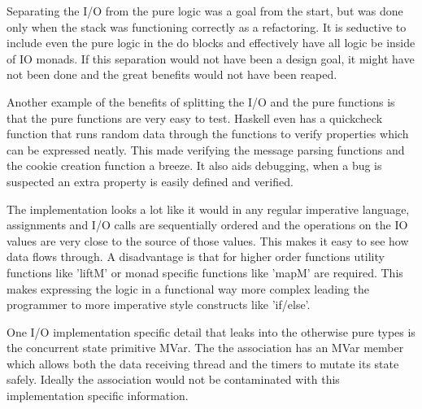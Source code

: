 Separating the I/O from the pure logic was a goal from the start, but was done only when the stack was functioning correctly as a refactoring. It is seductive to include even the pure logic in the do blocks and effectively have all logic be inside of IO monads. If this separation would not have been a design goal, it might have not been done and the great benefits would not have been reaped.

Another example of the benefits of splitting the I/O and the pure functions is that the pure functions are very easy to test. Haskell even has a quickcheck function that runs random data through the functions to verify properties which can be expressed neatly. This made verifying the message parsing functions and the cookie creation function a breeze. It also aids debugging, when a bug is suspected an extra property is easily defined and verified.

The implementation looks a lot like it would in any regular imperative language, assignments and I/O calls are sequentially ordered and the operations on the IO values are very close to the source of those values. This makes it easy to see how data flows through.
A disadvantage is that for higher order functions utility functions like 'liftM' or monad specific functions like 'mapM' are required. This makes expressing the logic in a functional way more complex leading the programmer to more imperative style constructs like 'if/else'.

One I/O implementation specific detail that leaks into the otherwise pure types is the concurrent state primitive MVar. The the association has an MVar member which allows both the data receiving thread and the timers to mutate its state safely. Ideally the association would not be contaminated with this implementation specific information.



